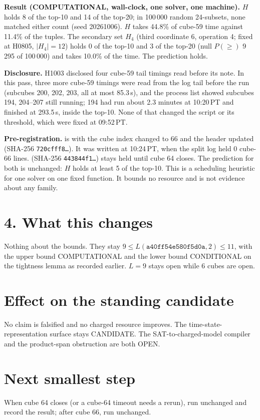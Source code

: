 \documentclass[11pt]{article}
\begin{document}
\textbf{Result (COMPUTATIONAL, wall-clock, one solver, one machine).} $H$ holds 8 of the top-10 and 14 of the top-20; in 100\,000 random 24-subsets, none matched either count (seed 20261006). $H$ takes 44.8\% of cube-59 time against 11.4\% of the tuples. The secondary set $H_4$ (third coordinate 6, operation 4; fixed at H0805, $|H_4|=12$) holds 0 of the top-10 and 3 of the top-20 (null $P(\ge)$ 9\,295 of 100\,000) and takes 10.0\% of the time. The prediction holds.

\textbf{Disclosure.} H1003 disclosed four cube-59 tail timings read before its note. In this pass, three more cube-59 timings were read from the log tail before the run (subcubes 200, 202, 203, all at most 85.3\,s), and the process list showed subcubes 194, 204--207 still running; 194 had run about 2.3 minutes at 10:20\,PT and finished at 293.5\,s, inside the top-10. None of that changed the script or its threshold, which were fixed at 09:52\,PT.

\textbf{Pre-registration.}  is  with the cube index changed to 66 and the header updated (SHA-256 \texttt{720cfff8\ldots}). It was written at 10:24\,PT, when the split log held 0 cube-66 lines.  (SHA-256 \texttt{443844f1\ldots}) stays held until cube 64 closes. The prediction for both is unchanged: $H$ holds at least 5 of the top-10. This is a scheduling heuristic for one solver on one fixed function. It bounds no resource and is not evidence about any family.

\section*{4. What this changes}
Nothing about the bounds. They stay $9\le L(\texttt{a40ff54e580f5d0a},2)\le 11$, with the upper bound COMPUTATIONAL and the lower bound CONDITIONAL on the tightness lemma as recorded earlier. $L=9$ stays open while 6 cubes are open.

\section*{Effect on the standing candidate}
No claim is falsified and no charged resource improves. The time-state-representation surface stays CANDIDATE. The SAT-to-charged-model compiler and the product-span obstruction are both OPEN.

\section*{Next smallest step}
When cube 64 closes (or a cube-64 timeout needs a rerun), run  unchanged and record the result; after cube 66, run  unchanged.
\end{document}

